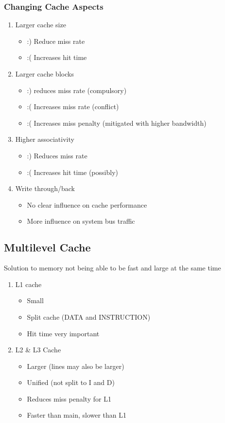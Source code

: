 \documentclass{article}
\newcommand\tab[1][0.5cm]{\hspace*{#1}}
\begin{document}
		\subsubsection{Changing Cache Aspects}
			\begin{enumerate}
				\item Larger cache size
				\begin{itemize}
					\item :) \tab Reduce miss rate
					\item :( \tab Increases hit time
				\end{itemize}

				\item Larger cache blocks
				\begin{itemize}
					\item :) \tab reduces miss rate (compulsory)
					\item :( \tab Increases miss rate (conflict)
					\item :( \tab Increases miss penalty (mitigated with higher bandwidth)
				\end{itemize}

				\item Higher associativity
				\begin{itemize}
					\item :) \tab Reduces miss rate
					\item :( \tab Increases hit time (possibly)
				\end{itemize}

				\item Write through/back
				\begin{itemize}
					\item No clear influence on cache performance
					\item More influence on system bus traffic
				\end{itemize}
			\end{enumerate}

	\subsection{Multilevel Cache}
		Solution to memory not being able to be fast and large at the same time
		\begin{enumerate}
			\item L1 cache
			\begin{itemize}
				\item Small
				\item Split cache (DATA and INSTRUCTION)
				\item Hit time very important
			\end{itemize}

			\item L2 \& L3 Cache
			\begin{itemize}
				\item Larger (lines may also be larger)
				\item Unified (not split to I and D)
				\item Reduces miss penalty for L1
				\item Faster than main, slower than L1
			\end{itemize}
		\end{enumerate}
\end{document}
